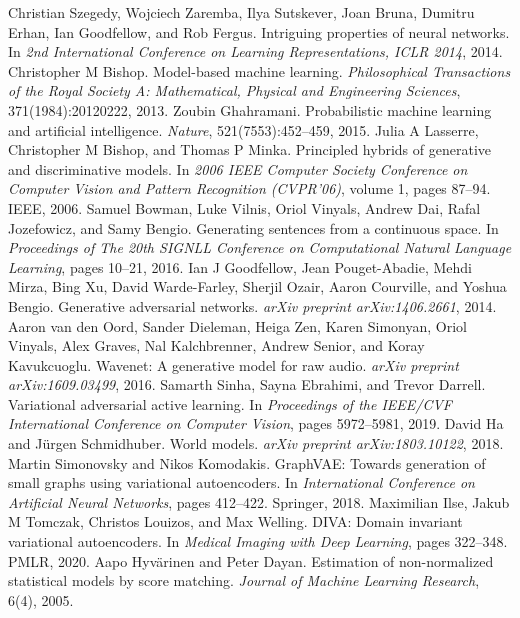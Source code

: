 \begin{chapterreferences}
 Christian Szegedy, Wojciech Zaremba, Ilya Sutskever, Joan Bruna, Dumitru Erhan, Ian Goodfellow, and Rob Fergus. Intriguing properties of neural networks. In \emph{2nd International Conference on Learning Representations, ICLR 2014}, 2014.
 Christopher M Bishop. Model-based machine learning. \emph{Philosophical Transactions of the Royal Society A: Mathematical, Physical and Engineering Sciences}, 371(1984):20120222, 2013.
 Zoubin Ghahramani. Probabilistic machine learning and artificial intelligence. \emph{Nature}, 521(7553):452–459, 2015.
 Julia A Lasserre, Christopher M Bishop, and Thomas P Minka. Principled hybrids of generative and discriminative models. In \emph{2006 IEEE Computer Society Conference on Computer Vision and Pattern Recognition (CVPR'06)}, volume 1, pages 87–94. IEEE, 2006.
 Samuel Bowman, Luke Vilnis, Oriol Vinyals, Andrew Dai, Rafal Jozefowicz, and Samy Bengio. Generating sentences from a continuous space. In \emph{Proceedings of The 20th SIGNLL Conference on Computational Natural Language Learning}, pages 10–21, 2016.
 Ian J Goodfellow, Jean Pouget-Abadie, Mehdi Mirza, Bing Xu, David Warde-Farley, Sherjil Ozair, Aaron Courville, and Yoshua Bengio. Generative adversarial networks. \emph{arXiv preprint arXiv:1406.2661}, 2014.
 Aaron van den Oord, Sander Dieleman, Heiga Zen, Karen Simonyan, Oriol Vinyals, Alex Graves, Nal Kalchbrenner, Andrew Senior, and Koray Kavukcuoglu. Wavenet: A generative model for raw audio. \emph{arXiv preprint arXiv:1609.03499}, 2016.
 Samarth Sinha, Sayna Ebrahimi, and Trevor Darrell. Variational adversarial active learning. In \emph{Proceedings of the IEEE/CVF International Conference on Computer Vision}, pages 5972–5981, 2019.
 David Ha and Jürgen Schmidhuber. World models. \emph{arXiv preprint arXiv:1803.10122}, 2018.
 Martin Simonovsky and Nikos Komodakis. GraphVAE: Towards generation of small graphs using variational autoencoders. In \emph{International Conference on Artificial Neural Networks}, pages 412–422. Springer, 2018.
 Maximilian Ilse, Jakub M Tomczak, Christos Louizos, and Max Welling. DIVA: Domain invariant variational autoencoders. In \emph{Medical Imaging with Deep Learning}, pages 322–348. PMLR, 2020.
 Aapo Hyvärinen and Peter Dayan. Estimation of non-normalized statistical models by score matching. \emph{Journal of Machine Learning Research}, 6(4), 2005.

\end{chapterreferences}
